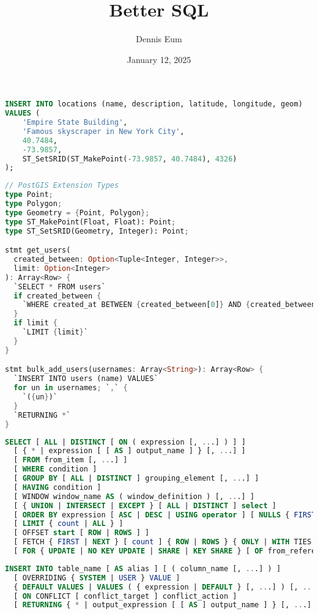 \documentclass[11pt, letterpaper]{article}
\title{Better SQL}
\author{Dennis Eum}
\date{January 12, 2025}
\begin{document}
\begin{lstlisting}[language=SQL]
INSERT INTO locations (name, description, latitude, longitude, geom)
VALUES (
    'Empire State Building',
    'Famous skyscraper in New York City',
    40.7484,
    -73.9857,
    ST_SetSRID(ST_MakePoint(-73.9857, 40.7484), 4326)
);
\end{lstlisting}

\begin{lstlisting}[language=Rust]
// PostGIS Extension Types
type Point;
type Polygon;
type Geometry = {Point, Polygon};
type ST_MakePoint(Float, Float): Point;
type ST_SetSRID(Geometry, Integer): Point;

stmt get_users(
  created_between: Option<Tuple<Integer, Integer>>,
  limit: Option<Integer>
): Array<Row> {
  `SELECT * FROM users`
  if created_between {
    `WHERE created_at BETWEEN {created_between[0]} AND {created_between[1]}`
  }
  if limit {
    `LIMIT {limit}`
  }
}

stmt bulk_add_users(usernames: Array<String>): Array<Row> {
  `INSERT INTO users (name) VALUES`
  for un in usernames; `,` {
    `({un})`
  }
  `RETURNING *`
}
\end{lstlisting}

\begin{lstlisting}[language=SQL]
SELECT [ ALL | DISTINCT [ ON ( expression [, ...] ) ] ]
  [ { * | expression [ [ AS ] output_name ] } [, ...] ]
  [ FROM from_item [, ...] ]
  [ WHERE condition ]
  [ GROUP BY [ ALL | DISTINCT ] grouping_element [, ...] ]
  [ HAVING condition ]
  [ WINDOW window_name AS ( window_definition ) [, ...] ]
  [ { UNION | INTERSECT | EXCEPT } [ ALL | DISTINCT ] select ]
  [ ORDER BY expression [ ASC | DESC | USING operator ] [ NULLS { FIRST | LAST } ] [, ...] ]
  [ LIMIT { count | ALL } ]
  [ OFFSET start [ ROW | ROWS ] ]
  [ FETCH { FIRST | NEXT } [ count ] { ROW | ROWS } { ONLY | WITH TIES } ]
  [ FOR { UPDATE | NO KEY UPDATE | SHARE | KEY SHARE } [ OF from_reference [, ...] ] [ NOWAIT | SKIP LOCKED ] [...] ]
\end{lstlisting}

\begin{lstlisting}[language=SQL]
INSERT INTO table_name [ AS alias ] [ ( column_name [, ...] ) ]
  [ OVERRIDING { SYSTEM | USER } VALUE ]
  { DEFAULT VALUES | VALUES ( { expression | DEFAULT } [, ...] ) [, ...] | query }
  [ ON CONFLICT [ conflict_target ] conflict_action ]
  [ RETURNING { * | output_expression [ [ AS ] output_name ] } [, ...] ]
\end{lstlisting}
\end{document}
